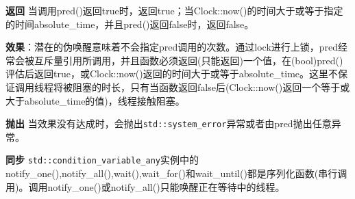 \textbf{返回}
当调用pred()返回true时，返回true；当Clock::now()的时间大于或等于指定的时间absolute\_time，并且pred()返回false时，返回false。

\textbf{效果}：潜在的伪唤醒意味着不会指定pred调用的次数。通过lock进行上锁，pred经常会被互斥量引用所调用，并且函数必须返回(只能返回)一个值，在(bool)pred()评估后返回true，或Clock::now()返回的时间大于或等于absolute\_time。这里不保证调用线程将被阻塞的时长，只有当函数返回false后(Clock::now()返回一个等于或大于absolute\_time的值)，线程接触阻塞。

\textbf{抛出}
当效果没有达成时，会抛出\texttt{std::system\_error}异常或者由pred抛出任意异常。

\textbf{同步}
\texttt{std::condition\_variable\_any}实例中的notify\_one(),notify\_all(),wait(),wait\_for()和wait\_until()都是序列化函数(串行调用)。调用notify\_one()或notify\_all()只能唤醒正在等待中的线程。